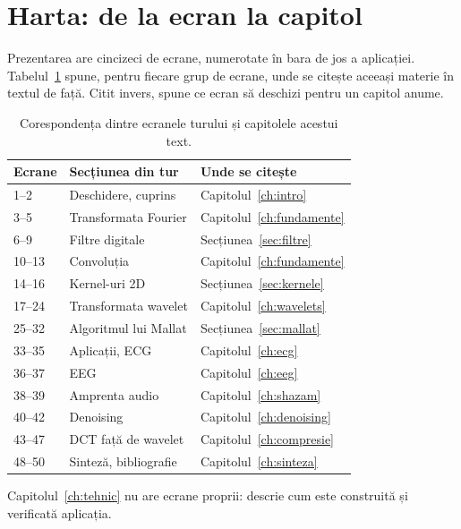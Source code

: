 \section{Harta: de la ecran la capitol}
\label{sec:harta}

Prezentarea are cincizeci de ecrane, numerotate în bara de jos a aplicației.
Tabelul~\ref{tab:harta} spune, pentru fiecare grup de ecrane, unde se citește
aceeași materie în textul de față. Citit invers, spune ce ecran să deschizi
pentru un capitol anume.

\begin{table}[htbp]
\centering
\caption{Corespondența dintre ecranele turului și capitolele acestui text.}
\label{tab:harta}
\small
\begin{tabular}{@{}llp{5.3cm}@{}}
\toprule
Ecrane & Secțiunea din tur & Unde se citește \\
\midrule
1--2 & Deschidere, cuprins & Capitolul~\ref{ch:intro} \\
3--5 & Transformata Fourier & Capitolul~\ref{ch:fundamente} \\
6--9 & Filtre digitale & Secțiunea~\ref{sec:filtre} \\
10--13 & Convoluția & Capitolul~\ref{ch:fundamente} \\
14--16 & Kernel-uri 2D & Secțiunea~\ref{sec:kernele} \\
17--24 & Transformata wavelet & Capitolul~\ref{ch:wavelets} \\
25--32 & Algoritmul lui Mallat & Secțiunea~\ref{sec:mallat} \\
33--35 & Aplicații, ECG & Capitolul~\ref{ch:ecg} \\
36--37 & EEG & Capitolul~\ref{ch:eeg} \\
38--39 & Amprenta audio & Capitolul~\ref{ch:shazam} \\
40--42 & Denoising & Capitolul~\ref{ch:denoising} \\
43--47 & DCT față de wavelet & Capitolul~\ref{ch:compresie} \\
48--50 & Sinteză, bibliografie & Capitolul~\ref{ch:sinteza} \\
\bottomrule
\end{tabular}
\end{table}

Capitolul~\ref{ch:tehnic} nu are ecrane proprii: descrie cum este construită
și verificată aplicația.

